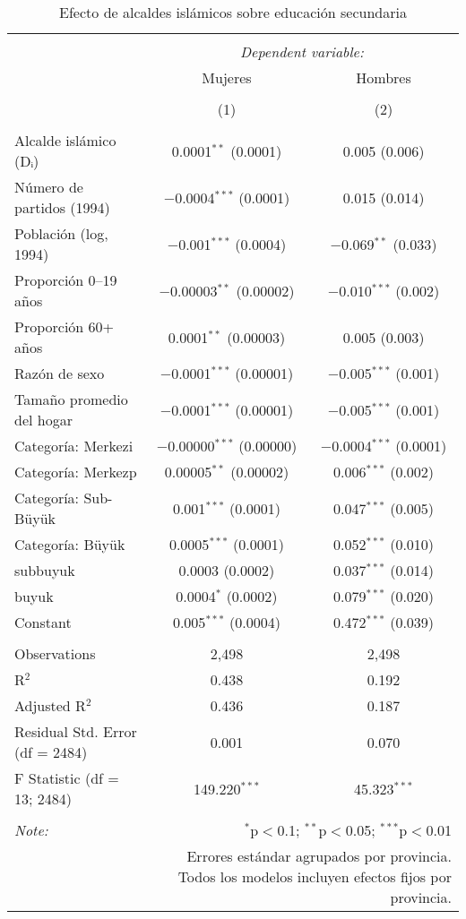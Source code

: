 \documentclass[
]{article}
\begin{document}
\begin{table}[ht!] \centering 
  \caption{Efecto de alcaldes islámicos sobre educación secundaria} 
  \label{tab:rd_controles_mujeres_hombres} 
\begin{tabular}{@{\extracolsep{5pt}}lcc} 
\\[-1.8ex]\hline 
\hline \\[-1.8ex] 
 & \multicolumn{2}{c}{\textit{Dependent variable:}} \\ 
\cline{2-3} 
 & Mujeres & Hombres \\ 
\\[-1.8ex] & (1) & (2)\\ 
\hline \\[-1.8ex] 
 Alcalde islámico (Dᵢ) & 0.0001$^{**}$ (0.0001) & 0.005 (0.006) \\ 
  Número de partidos (1994) & $-$0.0004$^{***}$ (0.0001) & 0.015 (0.014) \\ 
  Población (log, 1994) & $-$0.001$^{***}$ (0.0004) & $-$0.069$^{**}$ (0.033) \\ 
  Proporción 0–19 años & $-$0.00003$^{**}$ (0.00002) & $-$0.010$^{***}$ (0.002) \\ 
  Proporción 60+ años & 0.0001$^{**}$ (0.00003) & 0.005 (0.003) \\ 
  Razón de sexo & $-$0.0001$^{***}$ (0.00001) & $-$0.005$^{***}$ (0.001) \\ 
  Tamaño promedio del hogar & $-$0.0001$^{***}$ (0.00001) & $-$0.005$^{***}$ (0.001) \\ 
  Categoría: Merkezi & $-$0.00000$^{***}$ (0.00000) & $-$0.0004$^{***}$ (0.0001) \\ 
  Categoría: Merkezp & 0.00005$^{**}$ (0.00002) & 0.006$^{***}$ (0.002) \\ 
  Categoría: Sub-Büyük & 0.001$^{***}$ (0.0001) & 0.047$^{***}$ (0.005) \\ 
  Categoría: Büyük & 0.0005$^{***}$ (0.0001) & 0.052$^{***}$ (0.010) \\ 
  subbuyuk & 0.0003 (0.0002) & 0.037$^{***}$ (0.014) \\ 
  buyuk & 0.0004$^{*}$ (0.0002) & 0.079$^{***}$ (0.020) \\ 
  Constant & 0.005$^{***}$ (0.0004) & 0.472$^{***}$ (0.039) \\ 
 \hline \\[-1.8ex] 
Observations & 2,498 & 2,498 \\ 
R$^{2}$ & 0.438 & 0.192 \\ 
Adjusted R$^{2}$ & 0.436 & 0.187 \\ 
Residual Std. Error (df = 2484) & 0.001 & 0.070 \\ 
F Statistic (df = 13; 2484) & 149.220$^{***}$ & 45.323$^{***}$ \\ 
\hline 
\hline \\[-1.8ex] 
\textit{Note:}  & \multicolumn{2}{r}{$^{*}$p$<$0.1; $^{**}$p$<$0.05; $^{***}$p$<$0.01} \\ 
 & \multicolumn{2}{r}{Errores estándar agrupados por provincia. Todos los modelos incluyen efectos fijos por provincia.} \\ 
\end{tabular} 
\end{table}
\end{document}
